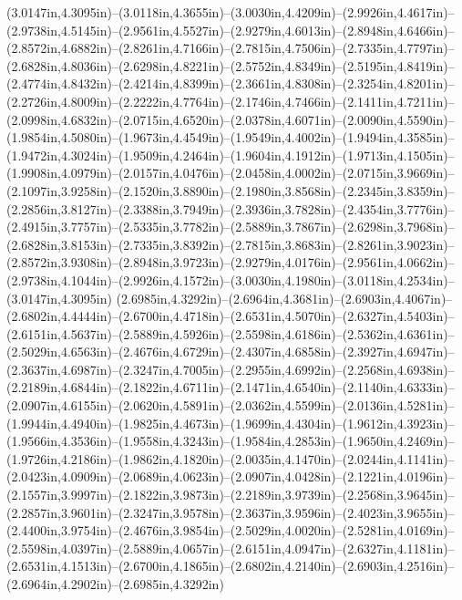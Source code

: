 (3.0147in,4.3095in)--(3.0118in,4.3655in)--(3.0030in,4.4209in)--(2.9926in,4.4617in)--(2.9738in,4.5145in)--(2.9561in,4.5527in)--(2.9279in,4.6013in)--(2.8948in,4.6466in)--(2.8572in,4.6882in)--(2.8261in,4.7166in)--(2.7815in,4.7506in)--(2.7335in,4.7797in)--(2.6828in,4.8036in)--(2.6298in,4.8221in)--(2.5752in,4.8349in)--(2.5195in,4.8419in)--(2.4774in,4.8432in)--(2.4214in,4.8399in)--(2.3661in,4.8308in)--(2.3254in,4.8201in)--(2.2726in,4.8009in)--(2.2222in,4.7764in)--(2.1746in,4.7466in)--(2.1411in,4.7211in)--(2.0998in,4.6832in)--(2.0715in,4.6520in)--(2.0378in,4.6071in)--(2.0090in,4.5590in)--(1.9854in,4.5080in)--(1.9673in,4.4549in)--(1.9549in,4.4002in)--(1.9494in,4.3585in)--(1.9472in,4.3024in)--(1.9509in,4.2464in)--(1.9604in,4.1912in)--(1.9713in,4.1505in)--(1.9908in,4.0979in)--(2.0157in,4.0476in)--(2.0458in,4.0002in)--(2.0715in,3.9669in)--(2.1097in,3.9258in)--(2.1520in,3.8890in)--(2.1980in,3.8568in)--(2.2345in,3.8359in)--(2.2856in,3.8127in)--(2.3388in,3.7949in)--(2.3936in,3.7828in)--(2.4354in,3.7776in)--(2.4915in,3.7757in)--(2.5335in,3.7782in)--(2.5889in,3.7867in)--(2.6298in,3.7968in)--(2.6828in,3.8153in)--(2.7335in,3.8392in)--(2.7815in,3.8683in)--(2.8261in,3.9023in)--(2.8572in,3.9308in)--(2.8948in,3.9723in)--(2.9279in,4.0176in)--(2.9561in,4.0662in)--(2.9738in,4.1044in)--(2.9926in,4.1572in)--(3.0030in,4.1980in)--(3.0118in,4.2534in)--(3.0147in,4.3095in) (2.6985in,4.3292in)--(2.6964in,4.3681in)--(2.6903in,4.4067in)--(2.6802in,4.4444in)--(2.6700in,4.4718in)--(2.6531in,4.5070in)--(2.6327in,4.5403in)--(2.6151in,4.5637in)--(2.5889in,4.5926in)--(2.5598in,4.6186in)--(2.5362in,4.6361in)--(2.5029in,4.6563in)--(2.4676in,4.6729in)--(2.4307in,4.6858in)--(2.3927in,4.6947in)--(2.3637in,4.6987in)--(2.3247in,4.7005in)--(2.2955in,4.6992in)--(2.2568in,4.6938in)--(2.2189in,4.6844in)--(2.1822in,4.6711in)--(2.1471in,4.6540in)--(2.1140in,4.6333in)--(2.0907in,4.6155in)--(2.0620in,4.5891in)--(2.0362in,4.5599in)--(2.0136in,4.5281in)--(1.9944in,4.4940in)--(1.9825in,4.4673in)--(1.9699in,4.4304in)--(1.9612in,4.3923in)--(1.9566in,4.3536in)--(1.9558in,4.3243in)--(1.9584in,4.2853in)--(1.9650in,4.2469in)--(1.9726in,4.2186in)--(1.9862in,4.1820in)--(2.0035in,4.1470in)--(2.0244in,4.1141in)--(2.0423in,4.0909in)--(2.0689in,4.0623in)--(2.0907in,4.0428in)--(2.1221in,4.0196in)--(2.1557in,3.9997in)--(2.1822in,3.9873in)--(2.2189in,3.9739in)--(2.2568in,3.9645in)--(2.2857in,3.9601in)--(2.3247in,3.9578in)--(2.3637in,3.9596in)--(2.4023in,3.9655in)--(2.4400in,3.9754in)--(2.4676in,3.9854in)--(2.5029in,4.0020in)--(2.5281in,4.0169in)--(2.5598in,4.0397in)--(2.5889in,4.0657in)--(2.6151in,4.0947in)--(2.6327in,4.1181in)--(2.6531in,4.1513in)--(2.6700in,4.1865in)--(2.6802in,4.2140in)--(2.6903in,4.2516in)--(2.6964in,4.2902in)--(2.6985in,4.3292in) 